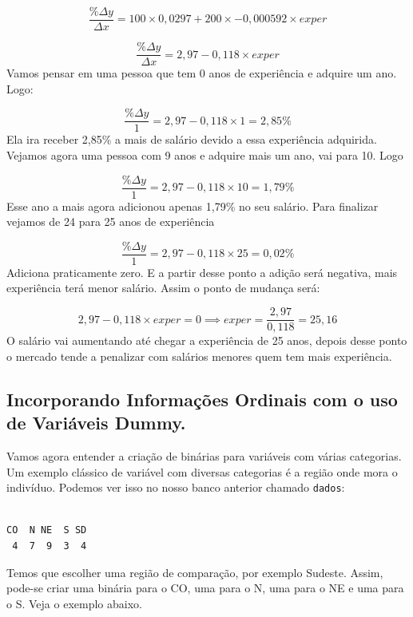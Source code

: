 \documentclass[
  letterpaper,
  DIV=11,
  numbers=noendperiod]{scrreprt}
\newenvironment{Shaded}{\begin{snugshade}}{\end{snugshade}}
\newcommand{\FunctionTok}[1]{\textcolor[rgb]{0.28,0.35,0.67}{#1}}
\newcommand{\NormalTok}[1]{\textcolor[rgb]{0.00,0.23,0.31}{#1}}
\newcommand{\SpecialCharTok}[1]{\textcolor[rgb]{0.37,0.37,0.37}{#1}}
\begin{document}
\[\frac{\% \Delta y }{\Delta x}= 100\times0,0297 +200\times -0,000592 \times exper\]

\[\frac{\% \Delta y }{\Delta x}= 2,97 -0,118 \times exper  \] Vamos
pensar em uma pessoa que tem 0 anos de experiência e adquire um ano.
Logo:

\[\frac{\% \Delta y }{1}= 2,97 -0,118 \times 1 = 2,85\% \] Ela ira
receber 2,85\% a mais de salário devido a essa experiência adquirida.
Vejamos agora uma pessoa com 9 anos e adquire mais um ano, vai para 10.
Logo

\[\frac{\% \Delta y }{1}= 2,97 -0,118 \times 10 = 1,79\% \] Esse ano a
mais agora adicionou apenas 1,79\% no seu salário. Para finalizar
vejamos de 24 para 25 anos de experiência

\[\frac{\% \Delta y }{1}= 2,97 -0,118 \times 25 = 0,02\% \] Adiciona
praticamente zero. E a partir desse ponto a adição será negativa, mais
experiência terá menor salário. Assim o ponto de mudança será:

\[ 2,97 -0,118 \times exper = 0 \implies exper=\frac{2,97}{0,118}=25,16 \]
O salário vai aumentando até chegar a experiência de 25 anos, depois
desse ponto o mercado tende a penalizar com salários menores quem tem
mais experiência.

\subsection{Incorporando Informações Ordinais com o uso de Variáveis
Dummy.}\label{incorporando-informauxe7uxf5es-ordinais-com-o-uso-de-variuxe1veis-dummy.}

Vamos agora entender a criação de binárias para variáveis com várias
categorias. Um exemplo clássico de variável com diversas categorias é a
região onde mora o indivíduo. Podemos ver isso no nosso banco anterior
chamado \texttt{dados}:

\begin{Shaded}
\end{Shaded}

\begin{verbatim}

CO  N NE  S SD 
 4  7  9  3  4 
\end{verbatim}

Temos que escolher uma região de comparação, por exemplo Sudeste. Assim,
pode-se criar uma binária para o CO, uma para o N, uma para o NE e uma
para o S. Veja o exemplo abaixo.
\end{document}
